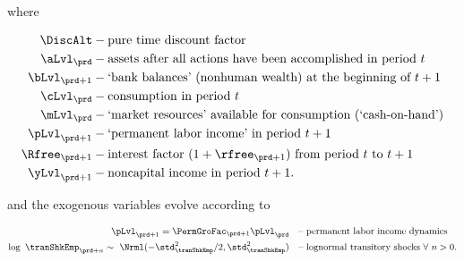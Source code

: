 \documentclass[titlepage, headings=optiontotocandhead]{econark}
\begin{document}

where

  \begin{equation*}\begin{gathered}\begin{aligned}
        {\DiscAlt}  & - \text{pure time discount factor} \\
        \aLvl_{\prd}  & - \text{assets after all actions have been accomplished in period $t$} \\
        \bLvl_{\prd+1}  & - \text{`bank balances' (nonhuman wealth) at the beginning of $t+1$} \\
        \cLvl_{\prd}  & - \text{consumption in period $t$} \\
        \mLvl_{\prd}  & - \text{`market resources' available for consumption (`cash-on-hand')} \\
        \pLvl_{\prd+1}  & - \text{`permanent labor income' in period $t+1$} \\
        \Rfree_{\prd+1}  & - \text{interest factor $(1+\rfree_{\prd+1})$ from period $t$ to $t+1$ } \\
        \yLvl_{\prd+1}  & - \text{noncapital income in period $t+1$}.
      \end{aligned}\end{gathered}\end{equation*}


and the exogenous variables evolve according to

  \begin{equation}\begin{gathered}\begin{aligned}
        \pLvl_{\prd+1}   = \PermGroFac_{\prd+1}\pLvl_{\prd}                                        & \text{~~ -- permanent labor income dynamics} \label{eq:permincgrow}
        \\ \log ~ \tranShkEmp_{\prd+n}  \sim ~\Nrml(-\std_{\tranShkEmp}^{2}/2,\std_{\tranShkEmp}^{2}) & \text{~~ -- lognormal transitory shocks}~\forall~n>0 .
      \end{aligned}\end{gathered}\end{equation}
\end{document}
